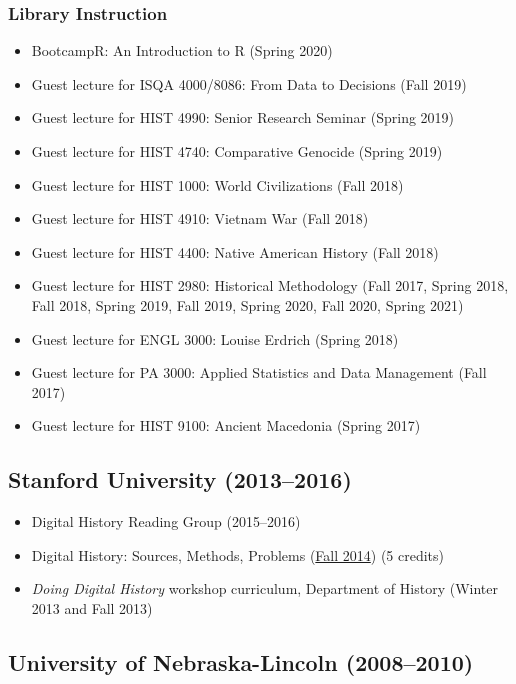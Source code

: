 \documentclass[10pt]{article}
\begin{document}
\subsubsection*{Library Instruction}

\begin{itemize}
  \item BootcampR: An Introduction to R (Spring 2020)
  \item Guest lecture for ISQA 4000/8086: From Data to Decisions (Fall 2019)
  \item Guest lecture for HIST 4990: Senior Research Seminar (Spring 2019)
  \item Guest lecture for HIST 4740: Comparative Genocide (Spring 2019)
  \item Guest lecture for HIST 1000: World Civilizations (Fall 2018)
  \item Guest lecture for HIST 4910: Vietnam War (Fall 2018)
  \item Guest lecture for HIST 4400: Native American History (Fall 2018)
  \item Guest lecture for HIST 2980: Historical Methodology (Fall 2017, Spring 2018, Fall 2018, Spring 2019, Fall 2019, Spring 2020, Fall 2020, Spring 2021)
  \item Guest lecture for ENGL 3000: Louise Erdrich (Spring 2018)
  \item Guest lecture for PA 3000: Applied Statistics and Data Management (Fall 2017)
  \item Guest lecture for HIST 9100: Ancient Macedonia (Spring 2017)
\end{itemize}

\subsection*{Stanford University (2013--2016)}

\begin{itemize}
  \item Digital History Reading Group (2015--2016)
  \item Digital History: Sources, Methods, Problems (\href{http://jasonheppler.org/teaching/hist205f.2014/}{Fall 2014}) (5 credits)
  \item \textit{Doing Digital History} workshop curriculum, Department of History (Winter 2013 and Fall 2013)
\end{itemize}

\subsection*{University of Nebraska-Lincoln (2008--2010)}
\end{document}
